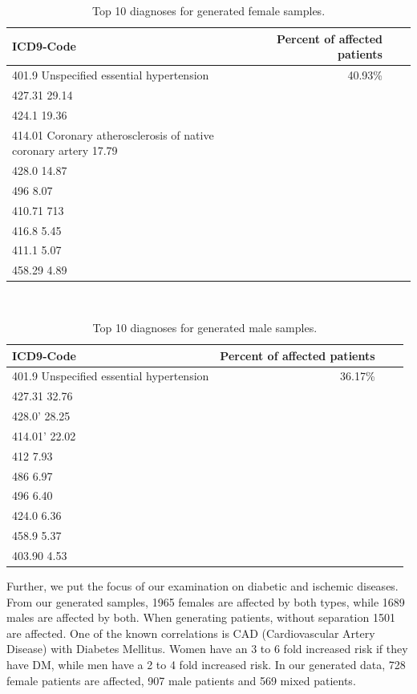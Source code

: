 \documentclass[11pt, a4paper]{book}
\begin{document}
\begin{table}
\begin{tabularx}{\textwidth}{p{}|r|X|r}
\textbf{ICD9-Code} & \textbf{Percent of affected patients}\\
\hline
401.9 Unspecified essential hypertension & 40.93\%\\
427.31 29.14\\
424.1 19.36\\
414.01 Coronary atherosclerosis of native coronary artery 17.79 \\
428.0   14.87\\
496		8.07\\
410.71 713\\
416.8      5.45\\
411.1      5.07\\
458.29     4.89\\
\end{tabularx}
\caption{\label{tab:top10-icd-female}Top 10 diagnoses for generated female samples.}
\end{table}
\\
\begin{table}
\begin{tabularx}{\textwidth}{p{}|r|X|r}
\textbf{ICD9-Code} & \textbf{Percent of affected patients}\\
\hline
401.9 Unspecified essential hypertension & 36.17\%\\
427.31	32.76\\
428.0'     28.25\\
414.01'    22.02\\
412        7.93\\
486        6.97\\
496        6.40\\
424.0      6.36\\
458.9      5.37\\
403.90     4.53\\
\end{tabularx}
\caption{\label{tab:top10-icd-male}Top 10 diagnoses for generated male samples.}
\end{table}
Further, we put the focus of our examination on diabetic and ischemic diseases. 
From our generated samples, 1965 females are affected by both types, while 1689 males are affected by both. When generating patients, without separation 1501 are affected.
One of the known correlations is CAD (Cardiovascular Artery Disease) with Diabetes Mellitus. Women have an 3 to 6 fold increased risk if they have DM, while men have a 2 to 4 fold increased risk. In our generated data, 728 female patients are affected, 907 male patients and 569 mixed patients.
\end{document}
